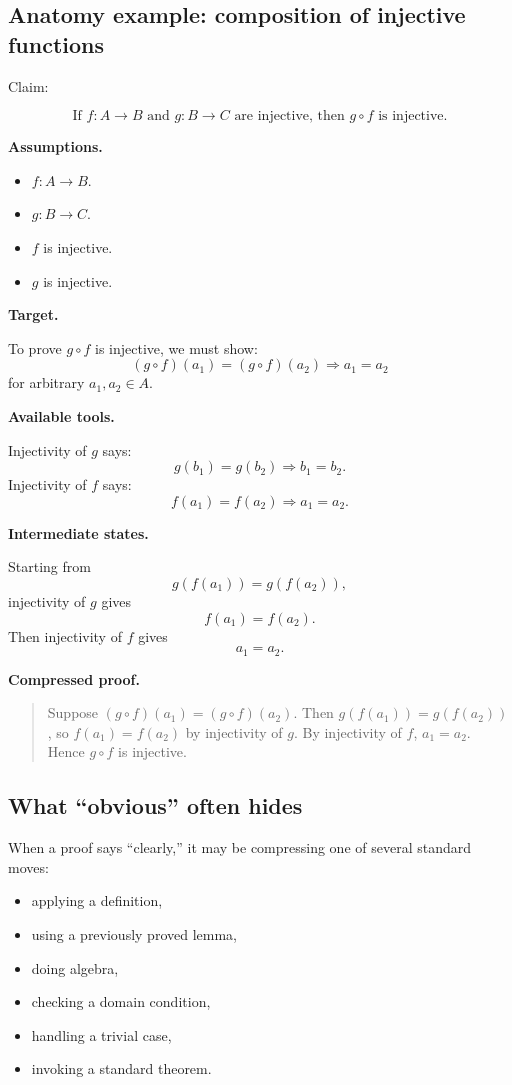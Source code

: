 \subsection{Anatomy example: composition of injective functions}

Claim:

\[
\text{If }f:A\to B\text{ and }g:B\to C\text{ are injective, then }g\circ f\text{ is injective.}
\]

\textbf{Assumptions.}

\begin{itemize}
\item $f:A\to B$.
\item $g:B\to C$.
\item $f$ is injective.
\item $g$ is injective.
\end{itemize}

\textbf{Target.}

To prove $g\circ f$ is injective, we must show:
\[
(g\circ f)(a_1)=(g\circ f)(a_2)\Rightarrow a_1=a_2
\]
for arbitrary $a_1,a_2\in A$.

\textbf{Available tools.}

Injectivity of $g$ says:
\[
g(b_1)=g(b_2)\Rightarrow b_1=b_2.
\]
Injectivity of $f$ says:
\[
f(a_1)=f(a_2)\Rightarrow a_1=a_2.
\]

\textbf{Intermediate states.}

Starting from
\[
g(f(a_1))=g(f(a_2)),
\]
injectivity of $g$ gives
\[
f(a_1)=f(a_2).
\]
Then injectivity of $f$ gives
\[
a_1=a_2.
\]

\textbf{Compressed proof.}

\begin{quote}
Suppose $(g\circ f)(a_1)=(g\circ f)(a_2)$. Then $g(f(a_1))=g(f(a_2))$, so $f(a_1)=f(a_2)$ by injectivity of $g$. By injectivity of $f$, $a_1=a_2$. Hence $g\circ f$ is injective.
\end{quote}

\subsection{What ``obvious'' often hides}

When a proof says ``clearly,'' it may be compressing one of several standard moves:

\begin{itemize}
\item applying a definition,
\item using a previously proved lemma,
\item doing algebra,
\item checking a domain condition,
\item handling a trivial case,
\item invoking a standard theorem.
\end{itemize}

